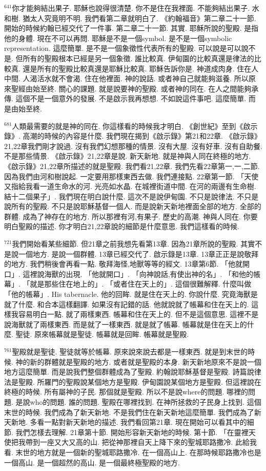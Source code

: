 \documentclass{book}
\begin{document}
$^{641}$你才能夠結出果子.
耶穌也說得很清楚.
你不是住在我裡面.
不能夠結出果子.
水和樹.
猶太人究竟明不明.
我們看第二章就明白了.
《約翰福音》第二章二十一節.
開始的時候約翰已經交代了一件事.
第二章二十一節.
其實.
耶穌所說的聖殿.
是指他的身體.
現在不可以再問.
耶穌是不是一個symbol.
是不是一個symbolic representation.
這麼簡單.
是不是一個象徵性代表所有的聖殿.
可以說是可以說不是.
但所有的聖殿根本已經是另一個象徵.
誰比較真.
伊甸園的比較真還是律法的比較真.
還是所有的聖殿比較真還是耶穌比較真.
耶穌告訴你是.
神道成肉身.
住在人中間.
人渴活水就不會渴.
住在他裡面.
神的說話.
或者神自己就能夠滋養.
所以原來聖經由始至終.
關心的課題.
就是說要神的聖殿.
或者神的同在.
在人之間能夠承傳.
這個不是一個意外的發展.
不是啟示我再想想.
不如說這件事吧.
這麼簡單.
而是由始至終.

$^{681}$人類最需要的就是神的同在.
你這樣看的時候我才明白.
《創世紀》至到《啟示錄》.
高潮的時候的內容是什麼.
我們現在揭到《啟示錄》第21和22章.
《啟示錄》21,22章我們剛才說過.
沒有我們幻想那種的情景.
沒有大屋.
沒有好車.
沒有自助餐.
不是那些情景.
《啟示錄》21,22章是說.
新天新地.
就是神與人同在終極的地方.
《啟示錄》21,22章所描述的就是聖殿.
我們看21,22章.
我們先看22章第一,一,二節.
因為我們由河和樹說起.
一定要用那樣東西去做.
我們連接點.
22章第一節.
「天使又指給我看一道生命水的河.
光亮如水晶.
在城裡街道中間.
在河的兩邊有生命樹.
結十二個果子」.
我們現在明白說什麼.
這次不是說伊甸園.
不只是說律法.
不只是說所有的聖殿.
不只是說耶穌基督一個人.
而是說新天新地裡面全部的地方.
全部的群體.
成為了神存在的地方.
所以那裡有河,有果子.
歷史的高潮.
神與人同在.
你要明白聖殿的描述.
你才明白21,22章說的細節是什麼意思.
我們這樣看的時候.

$^{721}$我們開始看某些細節.
但21章之前我想先看第13章.
因為21章所說的聖殿.
其實不是說一個地方.
是說一個群體.
13章已經交代了.
啟示錄是13章.
13章正正是說敬拜的地方.
我們稍後會再看一點.
敬拜海怪,地獸等等的經文.
13章第6節.
「他就開口」.
這裡說海獸的出現.
「他就開口」.
「向神說話,有使出神的名」.
「和他的帳幕」.
「就是那些住在地上的」.
「或者住在天上的」.
這個很難解釋.
什麼叫做「他的帳幕」.
His tabernacle.
他的回眸.
就是住在天上的.
你說什麼.
究竟海獸是就了什麼.
和合本這樣翻譯.
如果沒有記錯的話.
他就說就了帳幕和住在天上的.
這樣我容易明白一點.
就了兩樣東西.
帳幕和住在天上的.
但不是這個意思.
這裡不是說海獸就了兩樣東西.
而是就了一樣東西.
就是就了帳幕.
帳幕就是住在天上的什麼.
聖徒.
原來帳幕就是聖徒.
帳幕就是回眸.
帳幕就是聖殿.

$^{761}$聖殿就是聖徒.
聖徒就等於帳幕.
原來說來說去都是一樣東西.
就是到末世的時候.
神的新的群體就是聖殿的地方.
或者就是聖殿的本身.
新天新地原來不是說一個地方這麼簡單.
而是說我們整個群體成為了聖殿.
約翰說耶穌基督是聖殿.
詩篇說律法是聖殿.
所羅門的聖殿說某個地方是聖殿.
伊甸園說某個地方是聖殿.
但這裡說在終極的時候.
所有屬神的子民.
那個就是聖殿.
所以不是說where的問題.
哪裡的問題.
是說who的問題.
誰的問題.
聖殿在哪裡找到.
在神所拯救的子民身上找到.
這個末世的時候.
我們成為了新天新地.
不是我們住在新天新地這麼簡單.
我們成為了新天新地.
多看一點對新天新地的描述.
我們看回第21章.
現在開始可以看其中的細節.
我們怎樣去理解.
21章第十節.
開始形容新天新地的時候.
第十節.
「在靈裡天使把我帶到一座又大又高的山.
把從神那裡自天上降下來的聖城耶路撒冷.
此給我看.
末世的地方就是一個新的聖城耶路撒冷.
在一個高山上.
在那時候耶路撒冷也是一個高山.
是一個超然的高山.
是一個最終極聖殿的地方.
\end{document}
